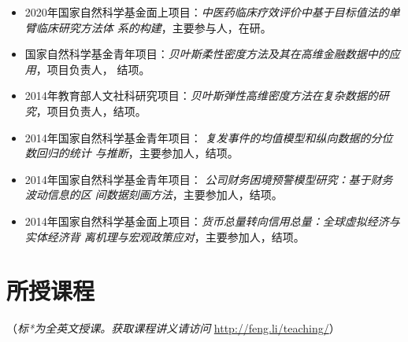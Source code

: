 \documentclass[twoside,a4paper,10pt]{amsart}
\begin{document}
\begin{itemize}

\item 2020年国家自然科学基金面上项目：\emph{中医药临床疗效评价中基于目标值法的单臂临床研究方法体
    系的构建}，主要参与人，在研。

\item 国家自然科学基金青年项目：\emph{贝叶斯柔性密度方法及其在高维金融数据中的应用}，项目负责人，
  结项。

\item 2014年教育部人文社科研究项目：\emph{贝叶斯弹性高维密度方法在复杂数据的研
    究}，项目负责人，结项。

\item 2014年国家自然科学基金青年项目： \emph{复发事件的均值模型和纵向数据的分位数回归的统计
    与推断}，主要参加人，结项。

\item 2014年国家自然科学基金青年项目： \emph{公司财务困境预警模型研究：基于财务波动信息的区
    间数据刻画方法}，主要参加人，结项。

\item 2014年国家自然科学基金面上项目：\emph{货币总量转向信用总量：全球虚拟经济与实体经济背
    离机理与宏观政策应对}，主要参加人，结项。

\end{itemize}

\section*{所授课程}
（\emph{标*为全英文授课。获取课程讲义请访问} \url{http://feng.li/teaching/}）
\end{document}
